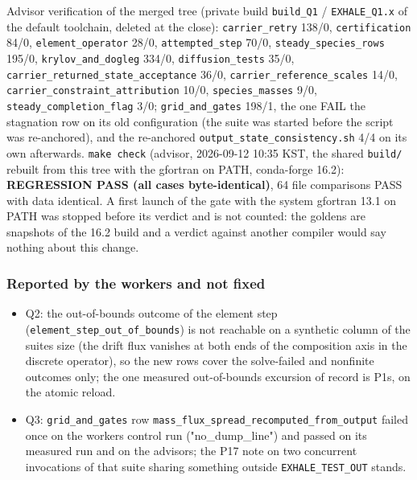 \documentclass[english,a4paper]{my_memo}
\providecommand{\tightlist}{\setlength{\itemsep}{0pt}\setlength{\parskip}{0pt}}
\begin{document}
Advisor verification of the merged tree (private build \texttt{build\_Q1} /
\texttt{EXHALE\_Q1.x} of the default toolchain, deleted at the close): \texttt{carrier\_retry}
138/0, \texttt{certification} 84/0, \texttt{element\_operator} 28/0, \texttt{attempted\_step} 70/0,
\texttt{steady\_species\_rows} 195/0, \texttt{krylov\_and\_dogleg} 334/0, \texttt{diffusion\_tests}
35/0, \texttt{carrier\_returned\_state\_acceptance} 36/0, \texttt{carrier\_reference\_scales}
14/0, \texttt{carrier\_constraint\_attribution} 10/0, \texttt{species\_masses} 9/0,
\texttt{steady\_completion\_flag} 3/0; \texttt{grid\_and\_gates} 198/1, the one FAIL the
stagnation row on its old configuration (the suite was started before the
script was re-anchored), and the re-anchored \texttt{output\_state\_consistency.sh}
4/4 on its own afterwards. \texttt{make\ check} (advisor, 2026-09-12 10:35 KST, the
shared \texttt{build/} rebuilt from this tree with the gfortran on PATH, conda-forge
16.2): \textbf{REGRESSION PASS (all cases byte-identical)}, 64 file comparisons
PASS with data identical. A first launch of the gate with the system gfortran
13.1 on PATH was stopped before its verdict and is not counted: the goldens
are snapshots of the 16.2 build and a verdict against another compiler would
say nothing about this change.

\subsubsection{Reported by the workers and not fixed}\label{reported-by-the-workers-and-not-fixed-1}

\begin{itemize}
\tightlist
\item
  Q2: the out-of-bounds outcome of the element step (\texttt{element\_step\_out\_of\_bounds})
  is not reachable on a synthetic column of the suite\textquotesingle s size (the drift flux
  vanishes at both ends of the composition axis in the discrete operator), so
  the new rows cover the solve-failed and nonfinite outcomes only; the one
  measured out-of-bounds excursion of record is P1\textquotesingle s, on the atomic reload.
\item
  Q3: \texttt{grid\_and\_gates} row \texttt{mass\_flux\_spread\_recomputed\_from\_output} failed
  once on the worker\textquotesingle s control run ("no\_dump\_line") and passed on its measured
  run and on the advisor\textquotesingle s; the P17 note on two concurrent invocations of that
  suite sharing something outside \texttt{EXHALE\_TEST\_OUT} stands.
\end{itemize}
\end{document}
